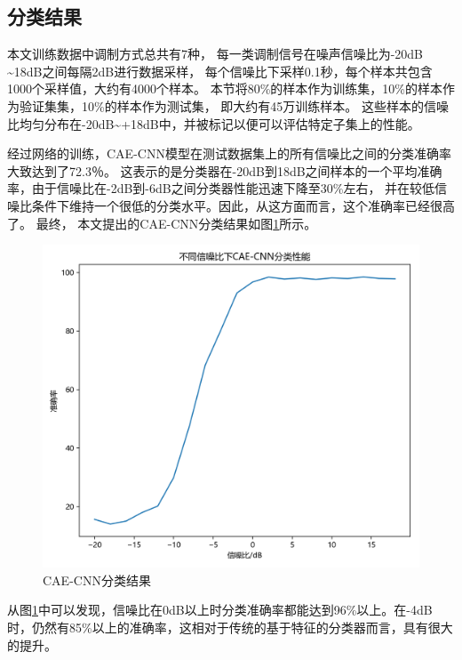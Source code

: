 \subsection{分类结果}
本文训练数据中调制方式总共有7种，
每一类调制信号在噪声信噪比为-20dB \textasciitilde 18dB之间每隔2dB进行数据采样，
每个信噪比下采样0.1秒，每个样本共包含1000个采样值，大约有4000个样本。
本节将80\%的样本作为训练集，10\%的样本作为验证集集，10\%的样本作为测试集，
即大约有45万训练样本。 这些样本的信噪比均匀分布在-20dB\textasciitilde+18dB中，并被标记以便可以评估特定子集上的性能。\par

经过网络的训练，CAE-CNN模型在测试数据集上的所有信噪比之间的分类准确率大致达到了72.3％。
这表示的是分类器在-20dB到18dB之间样本的一个平均准确率，由于信噪比在-2dB到-6dB之间分类器性能迅速下降至30\%左右，
并在较低信噪比条件下维持一个很低的分类水平。因此，从这方面而言，这个准确率已经很高了。
最终， 本文提出的CAE-CNN分类结果如图\ref{sec:fig_3_9}所示。\par

\begin{figure}[!h]
	\centering
	\includegraphics[scale=0.7]{figures/chapter_3/fig_3_9}
	\caption{CAE-CNN分类结果}	\label{sec:fig_3_9}
\end{figure}

从图\ref{sec:fig_3_9}中可以发现，信噪比在0dB以上时分类准确率都能达到96\%以上。在-4dB时，仍然有85\%以上的准确率，这相对于传统的基于特征的分类器而言，具有很大的提升。\par

